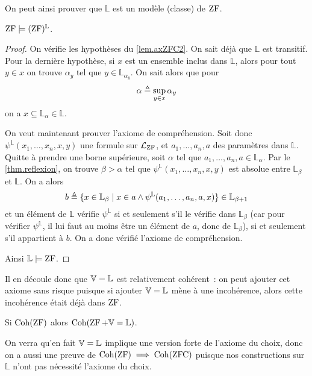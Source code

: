 On peut ainsi prouver que $\mathbb L$ est un modèle (classe) de $\operatorname{ZF}$.

\begin{theorem}
  $\operatorname{ZF}\models (\operatorname{ZF})^{\mathbb L}$.
\end{theorem}

\begin{proof}
  On vérifie les hypothèses du \cref{lem.axZFC2}. On sait déjà que $\mathbb L$
  est transitif. Pour la dernière hypothèse, si $x$ est un ensemble inclus dans
  $\mathbb L$, alors pour tout $y \in x$ on trouve $\alpha_y$ tel que
  $y \in \mathbb L_{\alpha_y}$. On sait alors que pour
  \[\alpha \triangleq \sup_{y \in x} \alpha_y\]
  on a $x \subseteq \mathbb L_\alpha \in \mathbb L$.

  On veut maintenant prouver l'axiome de compréhension. Soit donc
  $\psi^{\mathbb L}(x_1,\ldots,x_n,x,y)$ une formule sur $\mathcal L_{\operatorname{ZF}}$, et
  $a_1,\ldots,a_n,a$ des paramètres dans $\mathbb L$. Quitte à prendre une
  borne supérieure, soit $\alpha$ tel que
  $a_1,\ldots,a_n,a \in \mathbb L_\alpha$. Par le \cref{thm.reflexion}, on
  trouve $\beta > \alpha$ tel que $\psi^{\mathbb L}(x_1,\ldots,x_n,x,y)$ est
  absolue entre $\mathbb L_\beta$ et $\mathbb L$. On a alors
  \[b\triangleq \{ x \in \mathbb L_\beta \mid x \in a \land
  \psi^{\mathbb L}(a_1,\ldots,a_n,a,x)\} \in \mathbb L_{\beta + 1}\]
  et un élément de $\mathbb L$ vérifie $\psi^{\mathbb L}$ si et seulement s'il
  le vérifie dans $\mathbb L_{\beta}$ (car pour vérifier $\psi^{\mathbb L}$, il lui
  faut au moins être un élément de $a$, donc de $\mathbb L_\beta$), si et
  seulement s'il appartient à $b$. On a donc vérifié l'axiome de compréhension.

  Ainsi $\mathbb L \models \operatorname{ZF}$.
\end{proof}

Il en découle donc que $\mathbb V = \mathbb L$ est relativement cohérent~: on peut ajouter cet
axiome sans risque puisque si ajouter $\mathbb V = \mathbb L$ mène à une incohérence, alors
cette incohérence était déjà dans $\operatorname{ZF}$.

\begin{corollary}
  Si $\operatorname{Coh}(\operatorname{ZF})$ alors $\operatorname{Coh}(\operatorname{ZF} + \mathbb V = \mathbb L)$.
\end{corollary}

\begin{remark}
  On verra qu'en fait $\mathbb V = \mathbb L$ implique une version forte de l'axiome du choix,
  donc on a aussi une preuve de $\operatorname{Coh}(\operatorname{ZF})\implies \operatorname{Coh}(\operatorname{ZFC})$ puisque nos
  constructions sur $\mathbb L$ n'ont pas nécessité l'axiome du choix.
\end{remark}

